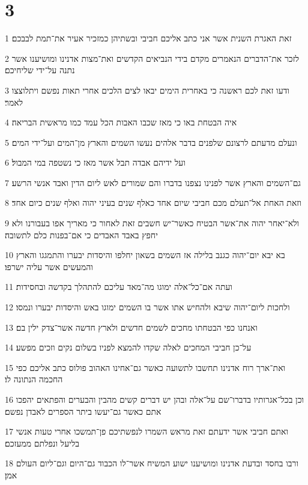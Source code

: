 \chapter{3}

\par 1 זאת האגרת השנית אשר אני כתב אליכם חביבי ובשתיהן כמזכיר אעיר את־תמת לבבכם׃
\par 2 לזכר את־הדברים הנאמרים מקדם בידי הנביאים הקדשים ואת־מצות אדנינו ומושיענו אשר נתנה על־ידי שליחיכם׃
\par 3 ודעו זאת לכם ראשנה כי באחרית הימים יבאו לצים הלכים אחרי תאות נפשם ויתלוצצו לאמר׃
\par 4 איה הבטחת באו כי מאז שכבו האבות הכל עמד כמו מראשית הבריאה׃
\par 5 ונעלם מדעתם לרצונם שלפנים בדבר אלהים נעשו השמים והארץ מן־המים ועל־ידי המים׃
\par 6 ועל ידיהם אבדה תבל אשר מאז כי נשטפה במי המבול׃
\par 7 גם־השמים והארץ אשר לפנינו נצפנו בדברו והם שמורים לאש ליום הדין ואבד אנשי הרשע׃
\par 8 וזאת האחת אל־תעלם מכם חביבי שיום אחד כאלף שנים בעיני יהוה ואלף שנים כיום אחד׃
\par 9 ולא־יאחר יהוה את־אשר הבטיח כאשר־יש חשבים זאת לאחור כי מאריך אפו בעבורנו ולא יחפץ באבד האבדים כי אם־בפנות כלם לתשובה׃
\par 10 בא יבא יום־יהוה כגנב בלילה אז השמים בשאון יחלפו והיסדות יבערו והתמגגו והארץ והמעשים אשר עליה ישרפו׃
\par 11 ועתה אם־כל־אלה ימוגו מה־מאד עליכם להתהלך בקדשה ובחסידות׃
\par 12 ולחכות ליום־יהוה שיבא ולהחיש אתו אשר בו השמים ימוגו באש והיסדות יבערו ונמסו׃
\par 13 ואנחנו כפי הבטחתו מחכים לשמים חדשים ולארץ חדשה אשר־צדק ילין בם׃
\par 14 על־כן חביבי המחכים לאלה שקדו להמצא לפניו בשלום נקים וזכים מפשע׃
\par 15 ואת־ארך רוח אדנינו תחשבו לתשועה כאשר גם־אחינו האהוב פולוס כתב אליכם כפי החכמה הנתונה לו׃
\par 16 וכן בכל־אגרותיו בדברו־שם על־אלה ובהן יש דברים קשים מהבין והבערים והפתאים יהפכו אתם כאשר גם־יעשו ביתר הספרים לאבדן נפשם׃
\par 17 ואתם חביבי אשר ידעתם זאת מראש השמרו לנפשתיכם פן־תמשכו אחרי טעות אנשי בליעל ונפלתם ממעזכם׃
\par 18 ורבו בחסד ובדעת אדנינו ומושיענו ישוע המשיח אשר־לו הכבוד גם־היום וגם־ליום העולם אמן׃


